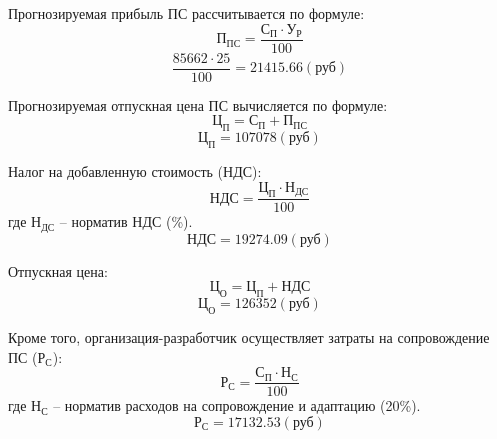 Прогнозируемая прибыль ПС рассчитывается по формуле:
\begin{equation}
\label{formula:economics:cost:f_pp}
{\text{П}}_{\text{ПС}} = \frac{ {\text{С}}_{\text{П}} \cdot {\text{У}}_{\text{Р}} }{ 100 }
\end{equation}
$$\frac{ 85662 \cdot 25  }{ 100 } = 21415.66 (\text{руб})$$

Прогнозируемая отпускная цена ПС вычисляется по формуле:
\begin{equation}
\label{formula:economics:cost:f_oprice}
{\text{Ц}}_{\text{П}} = {\text{С}}_{\text{П}} + {\text{П}}_{\text{ПС}}
\end{equation}
$${\text{Ц}}_{\text{П}} = 107078 (\text{руб})$$

Налог на добавленную стоимость (НДС):
\begin{equation}
\label{formula:economics:cost:f_nds}
{\text{НДС}} = \frac{ {\text{Ц}}_{\text{П}} \cdot {\text{Н}}_{\text{ДС}} }{ 100 }
\end{equation}
где ${\text{Н}}_{\text{ДС}}$ -- норматив НДС (\%).
$${\text{НДС}} = 19274.09 (\text{руб})$$

Отпускная цена:
\begin{equation}
\label{formula:economics:cost:f_price}
{\text{Ц}}_{\text{О}} = {\text{Ц}}_{\text{П}} + {\text{НДС}}
\end{equation}
$${\text{Ц}}_{\text{О}} = 126352 (\text{руб})$$

Кроме того, организация-разработчик осуществляет затраты на сопровождение ПС (${\text{Р}}_{\text{С}}$):
\begin{equation}
\label{formula:economics:cost:f_sup}
{\text{Р}}_{\text{С}} = \frac{ {\text{С}}_{\text{П}} \cdot {\text{Н}}_{\text{С}} }{ 100 }
\end{equation}
где ${\text{Н}}_{\text{С}}$ -- норматив расходов на сопровождение и адаптацию (20\%).
$${\text{Р}}_{\text{С}} = 17132.53 (\text{руб})$$
